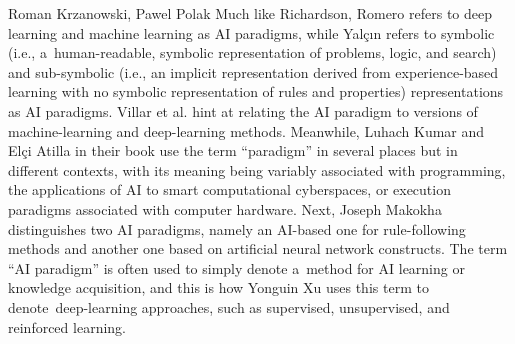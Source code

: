 \begin{artengenv2auth}{Roman Krzanowski, Pawel Polak}
Much like Richardson, Romero
\parencite*[][]{romero_unpopular_2021} %
 refers to deep learning and machine learning as AI paradigms, while Yalçın 
\parencite*[][]{osaba_artificial_2021} %
 refers to symbolic (i.e., a~human-readable, symbolic representation of problems, logic, and search) and sub-symbolic (i.e., an implicit representation derived from experience-based learning with no symbolic representation of rules and properties) representations as AI paradigms. Villar et al. 
\parencite*[][]{xu_artificial_2021} %
 hint at relating the AI paradigm to versions of machine-learning and deep-learning methods. Meanwhile, Luhach Kumar and El\c{c}i Atilla 
\parencite*[][]{luhach_artificial_2021} %
 in their book use the term ``paradigm'' in several places but in different contexts, with its meaning being variably associated with programming, the applications of AI to smart computational cyberspaces, or execution paradigms associated with computer hardware. Next, Joseph Makokha 
\parencite*[][]{makokha_artificial_2021} %
 distinguishes two AI paradigms, namely an AI-based one for rule-following methods and another one based on artificial neural network constructs. The term ``AI paradigm'' is often used to simply denote a~method for AI learning or knowledge acquisition, and this is how Yonguin Xu 
\parencite[][]{xu_artificial_2021} %
 uses this term to denote~deep-learning approaches, such as supervised, unsupervised, and reinforced learning.


\end{artengenv2auth}
